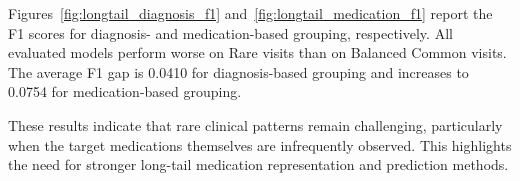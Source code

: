 \documentclass[manuscript,review]{acmart}
\begin{document}
Figures~\ref{fig:longtail_diagnosis_f1} and~\ref{fig:longtail_medication_f1} report the F1 scores for diagnosis- and medication-based grouping, respectively. All evaluated models perform worse on Rare visits than on Balanced Common visits. The average F1 gap is 0.0410 for diagnosis-based grouping and increases to 0.0754 for medication-based grouping.

These results indicate that rare clinical patterns remain challenging, particularly when the target medications themselves are infrequently observed. This highlights the need for stronger long-tail medication representation and prediction methods.



\end{document}
